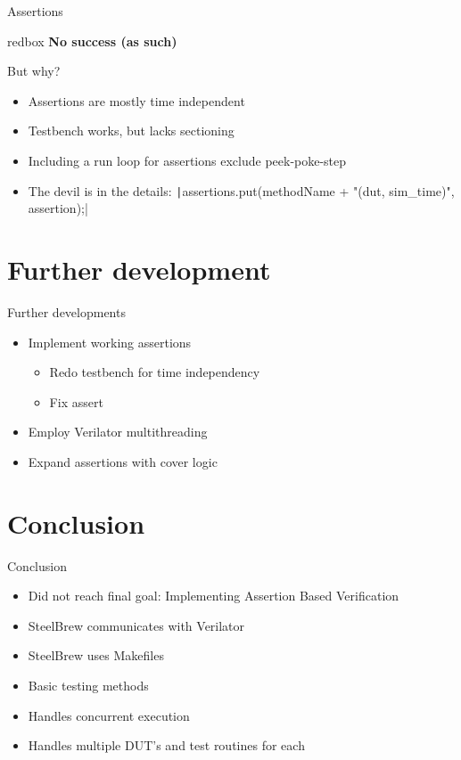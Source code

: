 \documentclass[aspectratio=169, handout]{beamer}
\begin{document}
\begin{frame}[containsverbatim]{Assertions}
    \begin{beamercolorbox}[sep=2em]{redbox}
        \textbf{No success (as such)}
    \end{beamercolorbox}
    But why?
    \begin{itemize}
        \item Assertions are mostly time independent
        \item Testbench works, but lacks sectioning
        \item Including a run loop for assertions exclude peek-poke-step
        \item The devil is in the details: \texttt|assertions.put(methodName + "(dut, sim_time)", assertion);|
    \end{itemize}
\end{frame}
\section{Further development}
\begin{frame}{Further developments}
    \begin{itemize}
        \item Implement working assertions
              \begin{itemize}
                  \item Redo testbench for time independency \faCheckCircle
                  \item Fix assert \faCheckCircle
              \end{itemize}
        \item Employ Verilator multithreading \faTimesCircle
        \item Expand assertions with cover logic \faTimesCircle
    \end{itemize}
\end{frame}
\section{Conclusion}
\begin{frame}{Conclusion}
    \begin{itemize}
        \item Did not reach final goal: Implementing Assertion Based Verification
        \item SteelBrew communicates with Verilator
        \item SteelBrew uses Makefiles
        \item Basic testing methods
        \item Handles concurrent execution
        \item Handles multiple DUT's and test routines for each
    \end{itemize}
\end{frame}
\end{document}

